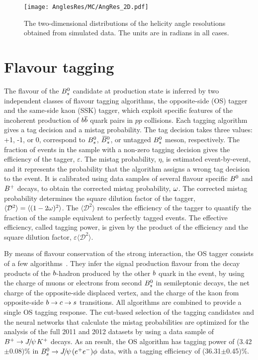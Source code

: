 \begin{figure}[hbt]
  \begin{center}
    \texttt{[image: AnglesRes/MC/AngRes\_2D.pdf]}
     \vspace*{-0.5cm}
  \end{center}
    \caption{
   The two-dimensional distributions of the helicity angle resolutions obtained from simulated data. The units are in radians in all cases.
}
  \label{fig:AnglesRes2D} 
\end{figure}
\clearpage

\section{Flavour tagging}\label{sec:FlavTagg}

The flavour of the ${{B}^0_{s}}$ candidate at production state is inferred by two independent classes of flavour tagging algorithms, the opposite-side (OS) tagger and the same-side kaon (SSK) tagger, which exploit specific features of the incoherent production of ${b}{\overline {{b}}}$ quark pairs in $pp$ collisions. Each tagging algorithm gives a tag decision and a mistag probability. The tag decision takes three values: +1, -1, or 0, correspond to ${{B}^0_{s}}$, ${{\kern 0.18em\overline{\kern -0.18em B}{}}{}^0_{s}}$, or untagged ${{B}^0_{s}}$ meson, respectively. The fraction of events in the sample with a non-zero tagging decision gives the efficiency of the tagger, $\varepsilon$. The mistag probability, $\eta$, is estimated event-by-event, and it represents the probability that the algorithm assigns a wrong tag decision to the event. It is calibrated using data samples of several flavour specific ${{B}^0}$ and ${{{B}^+}}$ decays, to obtain the corrected mistag probability, $\omega$. The corrected mistag probability determines the square dilution factor of the tagger, $\langle\mathcal{D}^{2}\rangle=\langle(1-2\omega)^{2}\rangle$. The $\langle\mathcal{D}^{2}\rangle$ rescales the efficiency of the tagger to quantify the fraction of the sample equivalent to perfectly tagged events. The effective efficiency, called tagging power, is given by the product of the efficiency and the square dilution factor, $\varepsilon\langle\mathcal{D}^{2}\rangle$.

By means of flavour conservation of the strong interaction, the OS tagger consists of a few algorithms~\cite{Aaij:2012mu}. They infer the signal production flavour from the decay products of the ${b}$-hadron produced by the other ${b}$ quark in the event, by using the charge of muons or electrons from second ${{B}^0_{s}}$ in semileptonic decays, the net charge of the opposite-side displaced vertex, and the charge of the kaon from opposite-side ${b}\rightarrow{\ensuremath{c}}\rightarrow{\ensuremath{s}}$ transitions. All algorithms are combined to provide a single OS tagging response. The cut-based selection of the tagging candidates and the neural networks that calculate the mistag probabilities are optimized for the analysis of the full 2011 and 2012 datasets by using a data sample of ${{{B}^+}}\rightarrow{\ensuremath{{J\mskip -3mu/\mskip -2mu\psi\mskip 2mu}}}{\ensuremath{{K}^+}}$ decays. As an result, the OS algorithm has tagging power of (3.42$\pm$0.08)$\%$ in ${{B}^0_{s}}\rightarrow{\ensuremath{{J\mskip -3mu/\mskip -2mu\psi\mskip 2mu}}}({e^+e^-})\phi$ data, with a tagging efficiency of (36.31$\pm$0.45)$\%$. 

